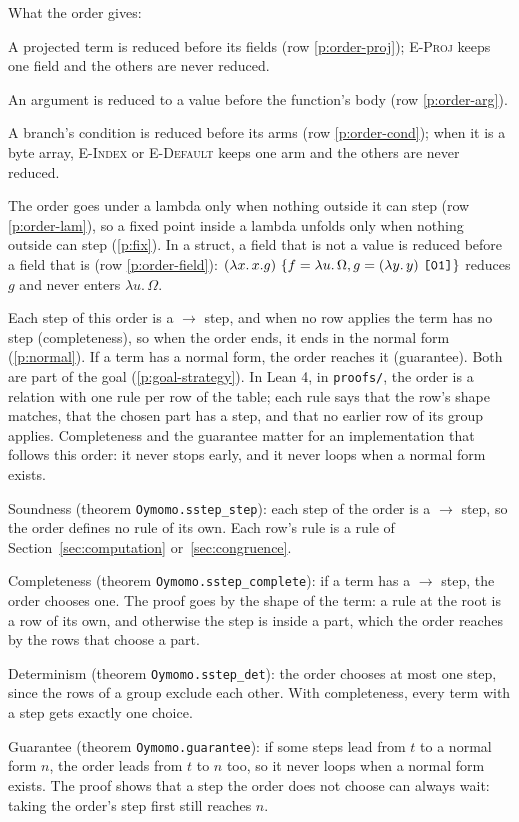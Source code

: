\documentclass[11pt,letterpaper]{article}
\newcommand{\step}{\mathrel{\longrightarrow}}     %
\newcommand{\lam}[2]{\lambda #1.\,#2}       %
\newcommand{\rn}[1]{\textsc{#1}}                %
\newcommand{\hex}[1]{\text{\ttfamily [#1]}}  %
\newcommand{\pref}[1]{\ref{#1}}  %
\begin{document}
\begin{points}
\[\]
\item What the order gives:
  \begin{subpoints}
  \item A projected term is reduced before its fields (row \pref{p:order-proj}); \rn{E-Proj} keeps one
    field and the others are never reduced.
  \item An argument is reduced to a value before the function's body (row \pref{p:order-arg}).
  \item A branch's condition is reduced before its arms (row \pref{p:order-cond}); when it is a byte array,
    \rn{E-Index} or \rn{E-Default} keeps one arm and the others are never reduced.
  \item The order goes under a lambda only when nothing outside it can step (row \pref{p:order-lam}), so a fixed point inside a lambda unfolds only
    when nothing outside can step (\pref{p:fix}). In a
    struct, a field that is not a value is reduced before a field that is (row \pref{p:order-field}):
    $(\lam{x}{x.g})\ \{f = \lam{u}{\Omega}, g = (\lam{y}{y})\ \hex{01}\}$ reduces $g$ and never enters $\lam{u}{\Omega}$.
  \end{subpoints}
\item Each step of this order is a $\step$ step, and when no row applies the term has no step
  (completeness), so when the order ends, it ends in the normal form (\pref{p:normal}). If a term has a
  normal form, the order reaches it (guarantee). Both are part of the goal (\pref{p:goal-strategy}). In Lean 4, in \texttt{proofs/}, the order is a relation with one rule per row of the table;
  each rule says that the row's shape matches, that the chosen part has a step, and that no
  earlier row of its group applies. Completeness and the guarantee matter for an implementation that follows
  this order: it never stops early, and it never loops when a normal form exists.
  \begin{subpoints}
  \item Soundness (theorem \texttt{Oymomo.sstep\_step}): each step of the order is a $\step$ step, so the
    order defines no rule of its own. Each row's rule is a rule of Section~\ref{sec:computation} or~\ref{sec:congruence}.
  \item Completeness (theorem \texttt{Oymomo.sstep\_complete}): if a term has a $\step$ step, the order chooses
    one. The proof goes by the shape of the term: a rule at the root is a row of its own, and
    otherwise the step is inside a part, which the order reaches by the rows that choose a part.
  \item Determinism (theorem \texttt{Oymomo.sstep\_det}): the order chooses at most one step, since the rows of
    a group exclude each other. With completeness, every term with a step gets exactly one choice.
  \item Guarantee (theorem \texttt{Oymomo.guarantee}): if some steps lead from $t$ to a normal form $n$,
    the order leads from $t$ to $n$ too, so it never loops when a normal form exists. The proof shows that a
    step the order does not choose can always wait: taking the order's step first still reaches $n$.
  \end{subpoints}
\end{points}
\end{document}
